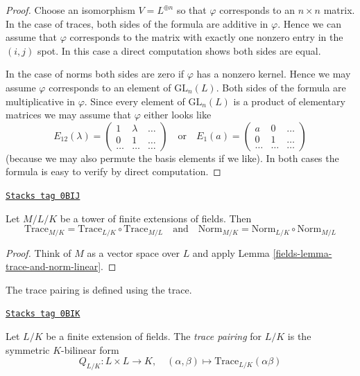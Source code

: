 \begin{proof}
Choose an isomorphism $V = L^{\oplus n}$ so that $\varphi$ corresponds
to an $n \times n$ matrix. In the case of traces, both sides of the formula
are additive in $\varphi$. Hence we can assume that $\varphi$
corresponds to the matrix with exactly one nonzero entry in the $(i, j)$ spot.
In this case a direct computation shows both sides are equal.

\medskip\noindent
In the case of norms both sides are zero if $\varphi$ has a nonzero kernel.
Hence we may assume $\varphi$ corresponds to an element of
$\text{GL}_n(L)$. Both sides of the formula are multiplicative in $\varphi$.
Since every element of $\text{GL}_n(L)$ is a product of elementary
matrices we may assume that $\varphi$ either looks like
$$
E_{12}(\lambda) =
\left(
\begin{matrix}
1 & \lambda & \ldots \\
0 & 1 & \ldots \\
\ldots & \ldots & \ldots
\end{matrix}
\right)
\quad\text{or}\quad
E_1(a) =
\left(
\begin{matrix}
a & 0 & \ldots \\
0 & 1 & \ldots \\
\ldots & \ldots & \ldots
\end{matrix}
\right)
$$
(because we may also permute the basis elements if we like).
In both cases the formula is easy to verify by direct computation.
\end{proof}

\begin{lemma}
\label{fields-lemma-trace-and-norm-tower}
\href{https://stacks.math.columbia.edu/tag/0BIJ}{\texttt{Stacks tag 0BIJ}}

Let $M/L/K$ be a tower of finite extensions of fields. Then
$$
\text{Trace}_{M/K} = \text{Trace}_{L/K} \circ \text{Trace}_{M/L}
\quad\text{and}\quad
\text{Norm}_{M/K} = \text{Norm}_{L/K} \circ \text{Norm}_{M/L}
$$
\end{lemma}

\begin{proof}

Think of $M$ as a vector space over $L$ and apply
Lemma \ref{fields-lemma-trace-and-norm-linear}.
\end{proof}

The trace pairing is defined using the trace.

\begin{definition}
\label{fields-definition-trace-pairing}
\href{https://stacks.math.columbia.edu/tag/0BIK}{\texttt{Stacks tag 0BIK}}

Let $L/K$ be a finite extension of fields. The {\it trace pairing}
for $L/K$ is the symmetric $K$-bilinear form
$$
Q_{L/K} : L \times L \longrightarrow K,\quad
(\alpha, \beta) \longmapsto \text{Trace}_{L/K}(\alpha\beta)
$$
\end{definition}

